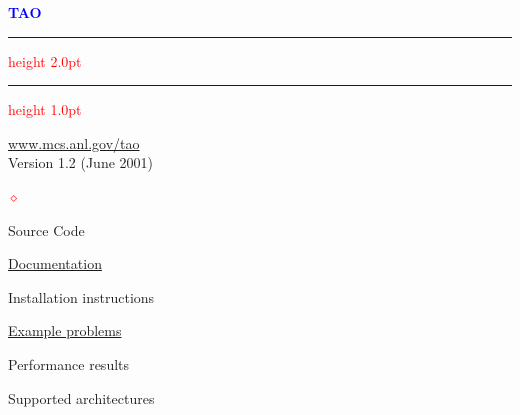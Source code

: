 \documentclass{seminar}
\newcommand{\reddiamond}{\textcolor{red}{$\diamond$}}
\newcommand{\redstripe}{\textcolor{red}{\hrule height 2.0pt\hfil}
             \vspace{-1.8pt}
             \textcolor{red}{\hrule height 1.0pt\hfil}
}
\newcommand{\heading}[1]{%
   \centerline{\textcolor{blue}{\textbf{#1}}}%
    \redstripe%
    \bigskip
}
\begin{document}
\begin{slide}

\heading{TAO}

\begin{center}
\href{http://www.mcs.anl.gov/tao}{www.mcs.anl.gov/tao} \\
Version 1.2 (June 2001)
\end{center}


\begin{list}{\reddiamond}{}
\item
Source Code
\item
\href{http://www.mcs.anl.gov/tao/docs}
{Documentation}
\item
Installation instructions
\item
\href{http://www-unix.mcs.anl.gov/tao/src/bound/examples/exercises/main.htm}%
{Example problems}
\item
Performance results
\item
Supported architectures
\end{list}

\vfill

\end{slide}
\end{document}
